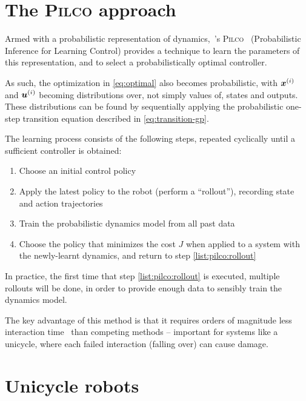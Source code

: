 \documentclass[main.tex]{subfiles}
\begin{document}
\section{The \textsc{Pilco} approach}

	Armed with a probabilistic representation of dynamics,~\citeauthor{pilco}'s \textsc{Pilco}~\cite{pilco} (Probabilistic Inference for Learning Control) provides a technique to learn the parameters of this representation, and to select a probabilistically optimal controller.

	As such, the optimization in \cref{eq:optimal} also becomes probabilistic\footnotemark, with $\bm{x}^{(i)}$ and $\bm{u}^{(i)}$ becoming distributions over, not simply values of, states and outputs. These distributions can be found by sequentially applying the probabilistic one-step transition equation described in \cref{eq:transition-gp}.


	The learning process consists of the following steps, repeated cyclically until a sufficient controller is obtained:
	\begin{enumerate}[nosep]
		\item Choose an initial control policy
		\item Apply the latest policy to the robot (perform a \enquote{rollout}), recording state and action trajectories \label{list:pilco:rollout}
		\item Train the probabilistic dynamics model from all past data
		\item Choose the policy that minimizes the cost $J$ when applied to a system with the newly-learnt dynamics, and return to step \ref{list:pilco:rollout}
	\end{enumerate}
	In practice, the first time that step \ref{list:pilco:rollout} is executed, multiple rollouts will be done, in order to provide enough data to sensibly train the dynamics model.

	The key advantage of this method is that it requires orders of magnitude less interaction time~\cite{pilco} than competing methods -- important for systems like a unicycle, where each failed interaction (falling over) can cause damage.

\section{Unicycle robots}
\end{document}
